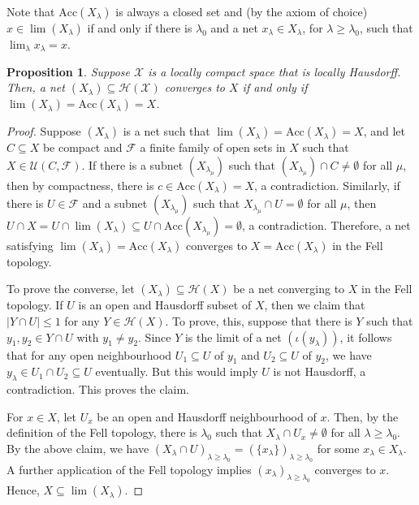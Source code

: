 \documentclass[a4paper, 12pt]{amsart}
\newtheorem{prp}[thm]{Proposition}
\theoremstyle{definition}
\theoremstyle{remark}
\numberwithin{equation}{section}
\begin{document}
Note that $\text{Acc}(X_{\lambda})$ is always a closed set and (by the axiom of choice) $x\in \lim(X_{\lambda})$ if and only if there is $\lambda_{0}$ and a net $x_{\lambda}\in X_{\lambda}$, for $\lambda\geq \lambda_{0}$, such that $\lim_{\lambda}x_{\lambda} = x$.

\begin{prp}
\label{prp:fell}
    Suppose $\mathcal{X}$ is a locally compact space that is locally Hausdorff. Then, a net $(X_{\lambda})\subseteq \mathcal{H}(\mathcal{X})$ converges to $X$ if and only if $\lim(X_{\lambda}) = \text{Acc}(X_{\lambda}) = X$.
\end{prp}
\begin{proof}
    Suppose $(X_{\lambda})$ is a net such that $\lim(X_{\lambda}) = \text{Acc}(X_{\lambda}) = X$, and let $C\subseteq X$ be compact and $\mathcal{F}$ a finite family of open sets in $X$ such that $X\in \mathcal{U}(C,\mathcal{F})$. If there is a subnet $(X_{\lambda_{\mu}})$ such that $(X_{\lambda_{\mu}})\cap C\neq \emptyset$ for all $\mu$, then by compactness, there is $c\in \text{Acc}(X_{\lambda}) = X$, a contradiction. Similarly, if there is $U\in\mathcal{F}$ and a subnet $(X_{\lambda_{\mu}})$ such that $X_{\lambda_{\mu}}\cap U=\emptyset$ for all $\mu$, then $U\cap X = U\cap \lim(X_{\lambda})\subseteq U\cap\text{Acc}(X_{\lambda_{\mu}}) = \emptyset$, a contradiction. Therefore, a net satisfying $\lim(X_{\lambda}) = \text{Acc}(X_{\lambda})$ converges to $X = \text{Acc}(X_{\lambda})$ in the Fell topology.

    To prove the converse, let $(X_{\lambda})\subseteq \mathcal{H}(X)$ be a net converging to $X$ in the Fell topology. If $U$ is an open and Hausdorff subset of $X$, then we claim that $|Y\cap U|\leq 1$ for any $Y\in \mathcal{H}(X)$. To prove, this, suppose that there is $Y$ such that $y_{1},y_{2}\in Y\cap U$ with $y_{1}\neq y_{2}$. Since $Y$ is the limit of a net $(\iota(y_{\lambda}))$, it follows that for any open neighbourhood $U_{1}\subseteq U$ of $y_{1}$ and $U_{2}\subseteq U$ of $y_{2}$, we have $y_{\lambda}\in U_{1}\cap U_{2}\subseteq U$ eventually. But this would imply $U$ is not Hausdorff, a contradiction. This proves the claim.

    For $x\in X$, let $U_{x}$ be an open and Hausdorff neighbourhood of $x$. Then, by the definition of the Fell topology, there is $\lambda_{0}$ such that $X_{\lambda}\cap U_{x}\neq \emptyset$ for all $\lambda\geq \lambda_{0}$. By the above claim, we have $(X_{\lambda}\cap U)_{\lambda\geq \lambda_{0}} = (\{x_{\lambda}\})_{\lambda\geq \lambda_{0}}$ for some $x_{\lambda}\in X_{\lambda}$. A further application of the Fell topology implies $(x_{\lambda})_{\lambda\geq \lambda_{0}}$ converges to $x$. Hence, $X\subseteq \lim(X_{\lambda})$.


\end{proof}
\end{document}
